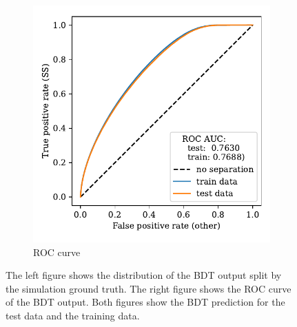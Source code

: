 \begin{figure}
\begin{subfigure}{0.5\textwidth}
        \includegraphics[width=\textwidth]{images/SS_ROC.pdf}
        \caption{ROC curve}
        \label{fig:SS_ROC}
    \end{subfigure}%
    \caption{The left figure shows the distribution of the BDT output split by the simulation ground truth. The right figure shows the ROC curve of the BDT output. Both figures show the BDT prediction for the test data and the training data.}
    \label{fig:SS_eval}
\end{figure}
